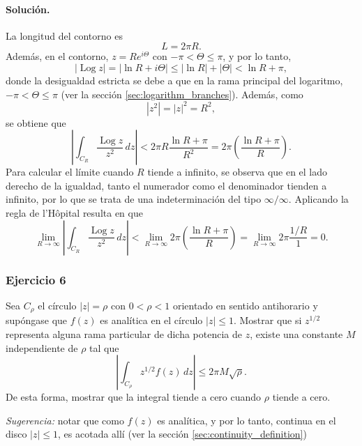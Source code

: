 \documentclass[a4paper]{report}
\DeclareMathOperator{\Log}{Log}
\begin{document}
\paragraph{Solución.} La longitud del contorno es 
\[
 L=2\pi R.
\]
Además, en el contorno, \(z=Re^{i\Theta}\) con \(-\pi<\Theta\leq\pi\), y por lo tanto,
\[
 |\Log z|=|\ln R+i\Theta|\leq|\ln R|+|\Theta|<\ln R+\pi,
\]
donde la desigualdad estricta se debe a que en la rama principal del logaritmo, \(-\pi<\Theta\leq\pi\) (ver la sección \ref{sec:logarithm_branches}). Además, como
\[
 |z^2|=|z|^2=R^2,
\]
se obtiene que 
\[
 \left|\int_{C_R}\frac{\Log z}{z^2}\,dz\right|<2\pi R\frac{\ln R+\pi}{R^2}=2\pi\left(\frac{\ln R+\pi}{R}\right).
\]
Para calcular el límite cuando \(R\) tiende a infinito, se observa que en el lado derecho de la igualdad, tanto el numerador como el denominador tienden a infinito, por lo que se trata de una indeterminación del tipo \(\infty/\infty\). Aplicando la regla de l'Hôpital resulta en que 
\[
 \lim_{R\to\infty}\left|\int_{C_R}\frac{\Log z}{z^2}\,dz\right|<\lim_{R\to\infty}2\pi\left(\frac{\ln R+\pi}{R}\right)=\lim_{R\to\infty}2\pi\frac{1/R}{1}=0.
\]

\subsubsection{Ejercicio 6}

Sea \(C_\rho\) el círculo \(|z|=\rho\) con \(0<\rho<1\) orientado en sentido antihorario y supóngase que \(f(z)\) es analítica en el círculo \(|z|\leq1\). Mostrar que si \(z^{1/2}\) representa alguna rama particular de dicha potencia de \(z\), existe una constante \(M\) independiente de \(\rho\) tal que 
\[
 \left|\int_{C_\rho}z^{1/2}f(z)\,dz\right|\leq2\pi M\sqrt{\rho}.
\]
De esta forma, mostrar que la integral tiende a cero cuando \(\rho\) tiende a cero.

\emph{Sugerencia:} notar que como \(f(z)\) es analítica, y por lo tanto, continua en el disco \(|z|\leq1\), es acotada allí (ver la sección \ref{sec:continuity_definition})
\end{document}
